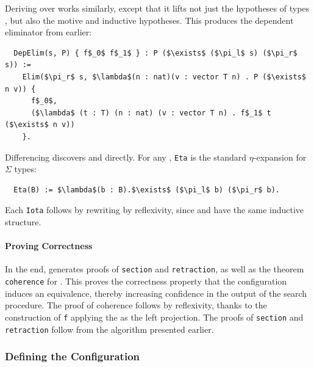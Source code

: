 Deriving  over \B works similarly, except that it lifts not just the hypotheses of types \Aa, but 
also the motive and inductive hypotheses.
This produces the dependent eliminator from earlier:

\begin{lstlisting}
  DepElim(s, P) { f$_0$ f$_1$ } : P ($\exists$ ($\pi_l$ s) ($\pi_r$ s)) :=
    Elim($\pi_r$ s, $\lambda$(n : nat)(v : vector T n) . P ($\exists$ n v)) {
      f$_0$,
      ($\lambda$ (t : T) (n : nat) (v : vector T n) . f$_1$ t ($\exists$ n v))
    }.
\end{lstlisting}

Differencing discovers  and  directly.
For any , \lstinline{Eta} is the standard $\eta$-expansion for $\Sigma$ types:

\begin{lstlisting}
  Eta(B) := $\lambda$(b : B).$\exists$ ($\pi_l$ b) ($\pi_r$ b).
\end{lstlisting}
Each \lstinline{Iota} follows by rewriting by reflexivity, since \Aa and \AI have the same inductive structure.

\paragraph{Proving Correctness}
In the end, \toolnamec generates proofs of \lstinline{section} and \lstinline{retraction},
as well as the  theorem \lstinline{coherence} for .
This proves the correctness property that the configuration induces an equivalence, thereby
increasing confidence in the output of the search procedure.
The proof of coherence follows by reflexivity, thanks to the construction of \lstinline{f} 
applying the  as the left projection.
The proofs of \lstinline{section} and \lstinline{retraction} follow from the algorithm presented earlier.

\iffalse
\subsubsection{Defining the Configuration}
\label{sec:config}

